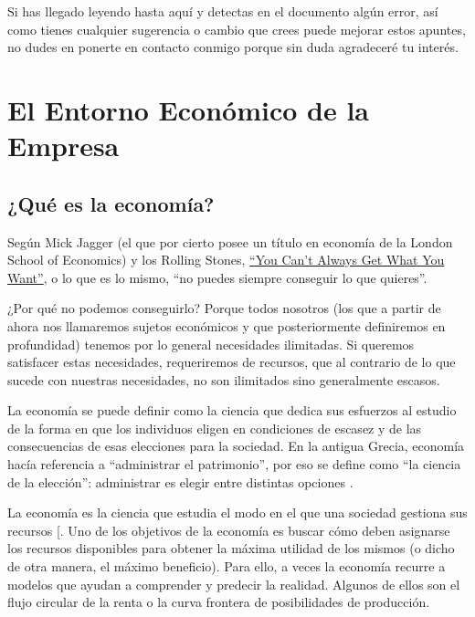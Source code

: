 \documentclass[
]{krantz}
\begin{document}
Si has llegado leyendo hasta aquí y detectas en el documento algún error, así como tienes cualquier sugerencia o cambio que crees puede mejorar estos apuntes, no dudes en ponerte en contacto conmigo porque sin duda agradeceré tu interés.

\mainmatter

\hypertarget{part-el-entorno-econuxf3mico-de-la-empresa}{%
\part{El Entorno Económico de la Empresa}\label{part-el-entorno-econuxf3mico-de-la-empresa}}

\hypertarget{quuxe9-es-la-economuxeda}{%
\chapter{¿Qué es la economía?}\label{quuxe9-es-la-economuxeda}}

Según Mick Jagger (el que por cierto posee un título en economía de la London School of Economics) y los Rolling Stones, \href{https://www.youtube.com/watch?v=oqMl5CRoFdk}{``You Can't Always Get What You Want''}, o lo que es lo mismo, ``no puedes siempre conseguir lo que quieres''.

¿Por qué no podemos conseguirlo? Porque todos nosotros (los que a partir de ahora nos llamaremos sujetos económicos y que posteriormente definiremos en profundidad) tenemos por lo general necesidades ilimitadas. Si queremos satisfacer estas necesidades, requeriremos de recursos, que al contrario de lo que sucede con nuestras necesidades, no son ilimitados sino generalmente escasos.

La economía se puede definir como la ciencia que dedica sus esfuerzos al estudio de la forma en que los individuos eligen en condiciones de escasez y de las consecuencias de esas elecciones para la sociedad. En la antigua Grecia, economía hacía referencia a ``administrar el patrimonio'', por eso se define como ``la ciencia de la elección'': administrar es elegir entre distintas opciones \citep{sande2015}.

La economía es la ciencia que estudia el modo en el que una sociedad gestiona sus recursos {[}\citet{mankiw2017}. Uno de los objetivos de la economía es buscar cómo deben asignarse los recursos disponibles para obtener la máxima utilidad de los mismos (o dicho de otra manera, el máximo beneficio). Para ello, a veces la economía recurre a modelos que ayudan a comprender y predecir la realidad. Algunos de ellos son el flujo circular de la renta o la curva frontera de posibilidades de producción.
\end{document}
